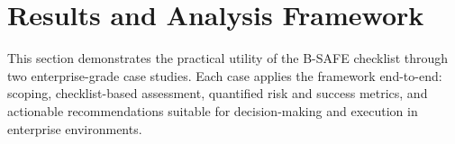 \section{Results and Analysis Framework}
\label{sec:results_and_analysis}

This section demonstrates the practical utility of the B-SAFE checklist through two enterprise-grade case studies. Each case applies the framework end-to-end: scoping, checklist-based assessment, quantified risk and success metrics, and actionable recommendations suitable for decision-making and execution in enterprise environments.





